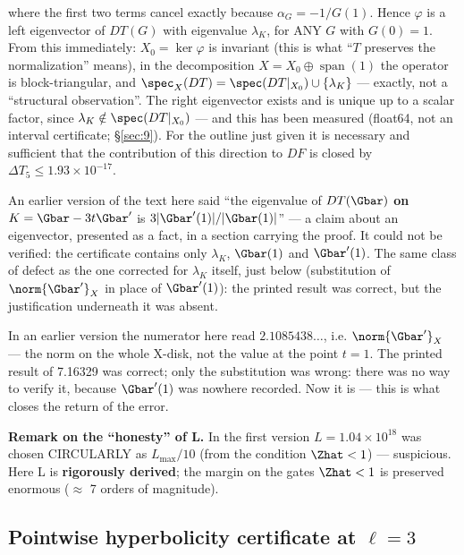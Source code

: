 where the first two terms cancel exactly because $\alpha_G = -1/G(1)$. Hence
$\varphi$ is a left eigenvector of $DT(G)$ with eigenvalue $\lambda_K$, for ANY
$G$ with $G(0) = 1$. From this immediately: $X_{0} = \ker \varphi$ is invariant
(this is what ``$T$ preserves the normalization'' means), in the decomposition
$X = X_{0} \oplus \operatorname{span}(1)$ the operator is block-triangular, and
$\spec_X(DT) = \spec(DT|_{X_{0}}) \cup \{\lambda_K\}$ --- exactly, not a
``structural observation''. The right eigenvector exists and is unique up to a
scalar factor, since $\lambda_K \notin \spec(DT|_{X_{0}})$ --- and this has been
measured (float64, not an interval certificate; \S\ref{sec:9}). For the outline just given it is necessary and sufficient that the
contribution of this direction to $DF$ is closed by $\Delta T_5 \le
1.93\times 10^{-17}$.

\begin{remark}
An earlier version of the text here said ``the eigenvalue of $DT(\Gbar)$
\textbf{on} $K = \Gbar - 3t\Gbar'$ is $3|\Gbar'(1)|/|\Gbar(1)|$'' --- a claim
about an eigenvector, presented as a fact, in a section carrying the proof. It
could not be verified: the certificate contains only $\lambda_K$, $\Gbar(1)$
and $\Gbar'(1)$. The same class of defect as the one corrected for $\lambda_K$
itself, just below (substitution of $\norm{\Gbar'}_X$ in place of $\Gbar'(1)$): the printed
result was correct, but the justification underneath it was absent.
\end{remark}

In an earlier version the numerator here read $2.1085438\ldots$, i.e. $\norm{\Gbar'}_X$
--- the norm on the whole X-disk, not the value at the point $t = 1$. The
printed result of 7.16329 was correct; only the substitution was wrong: there
was no way to verify it, because $\Gbar'(1)$ was nowhere recorded. Now it is
--- this is what closes the return of the error.

\textbf{Remark on the ``honesty'' of L.} In the first version
$L = 1.04\times 10^{18}$ was chosen CIRCULARLY as $L_{\max}/10$ (from the
condition $\Zhat<1$) --- suspicious. Here L is \textbf{rigorously derived};
the margin on the gates $\Zhat<1$ is preserved enormous ($\approx$ 7 orders of
magnitude).


\subsection{Pointwise hyperbolicity certificate at $\ell = 3$}
\label{sec:5.2}

